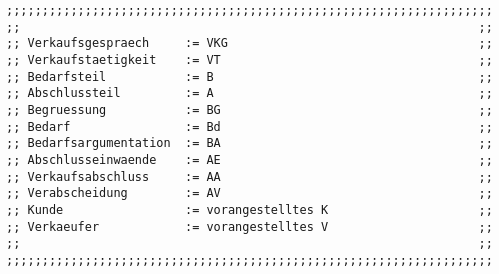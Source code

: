 \documentclass[12pt]{article}
\begin{document}
\begin{verbatim}
;;;;;;;;;;;;;;;;;;;;;;;;;;;;;;;;;;;;;;;;;;;;;;;;;;;;;;;;;;;;;;;;;;;;
;;                                                                ;;
;; Verkaufsgespraech     := VKG                                   ;;
;; Verkaufstaetigkeit    := VT                                    ;;
;; Bedarfsteil           := B                                     ;;
;; Abschlussteil         := A                                     ;;
;; Begruessung           := BG                                    ;;
;; Bedarf                := Bd                                    ;;
;; Bedarfsargumentation  := BA                                    ;;
;; Abschlusseinwaende    := AE                                    ;;
;; Verkaufsabschluss     := AA                                    ;;
;; Verabscheidung        := AV                                    ;;
;; Kunde                 := vorangestelltes K                     ;;
;; Verkaeufer            := vorangestelltes V                     ;;
;;                                                                ;;
;;;;;;;;;;;;;;;;;;;;;;;;;;;;;;;;;;;;;;;;;;;;;;;;;;;;;;;;;;;;;;;;;;;;


\end{verbatim}
\end{document}
